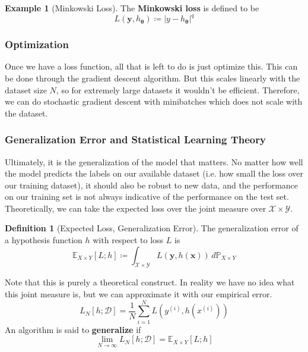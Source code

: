\documentclass{article}
\theoremstyle{definition}
\newtheorem{example}{Example}[section]
\newtheorem{definition}{Definition}[section]
\begin{document}
    \begin{example}[Minkowski Loss]
    The \textbf{Minkowski loss} is defined to be 
    \[L(\mathbf{y}, h_{\boldsymbol{\theta}}) \coloneqq | y - h_{\boldsymbol{\theta}} |^q\]
    \end{example}

    \subsubsection{Optimization}

    Once we have a loss function, all that is left to do is just optimize this. This can be done through the gradient descent algorithm. But this scales linearly with the dataset size $N$, so for extremely large datasets it wouldn't be efficient. Therefore, we can do stochastic gradient descent with minibatches which does not scale with the dataset. 

    \subsubsection{Generalization Error and Statistical Learning Theory}

    Ultimately, it is the generalization of the model that matters. No matter how well the model predicts the labels on our available dataset (i.e. how small the loss over our training dataset), it should also be robust to new data, and the performance on our training set is not always indicative of the performance on the test set. Theoretically, we can take the expected loss over the joint measure over $\mathcal{X} \times \mathcal{Y}$. 

    \begin{definition}[Expected Loss, Generalization Error]
    The generalization error of a hypothesis function $h$ with respect to loss $L$ is 
    \[\mathbb{E}_{X \times Y}[L; h] \coloneqq \int_{\mathcal{X} \times \mathcal{Y}} L(\mathbf{y}, h(\mathbf{x})) \, d\mathbb{P}_{X \times Y}\]
    \end{definition}
    Note that this is purely a theoretical construct. In reality we have no idea what this joint measure is, but we can approximate it with our empirical error. 
    \[L_N [h; \mathcal{D}] = \frac{1}{N} \sum_{i=1}^N L(y^{(i)}, h(x^{(i)}) )\]
    An algorithm is said to \textbf{generalize} if 
    \[\lim_{N \rightarrow \infty} L_N [h; \mathcal{D}] = \mathbb{E}_{X \times Y}[L; h]\]
\end{document}
